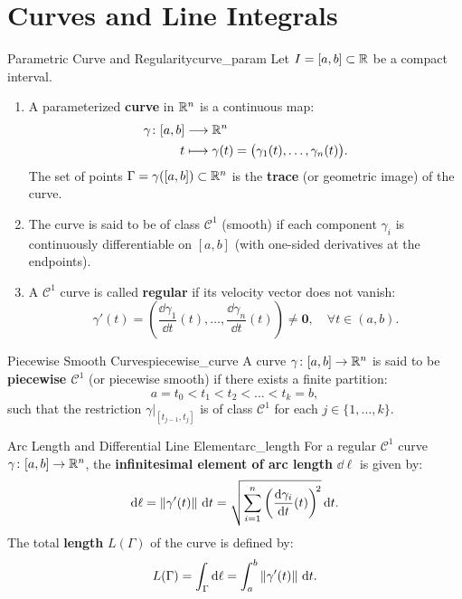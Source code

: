 \section{Curves and Line Integrals}

\begin{definition}{Parametric Curve and Regularity}{curve_param}
Let $I = [a, b] \subset \mathbb{R}$ be a compact interval.
\begin{enumerate}[label=\upshape(\roman*)]
    \item A parameterized \textbf{curve} in $\mathbb{R}^n$ is a continuous map:
    \begin{align*}
        \gamma \colon [a, b] &\longrightarrow \mathbb{R}^n \\
        t &\longmapsto \gamma(t) = \bigl(\gamma_1(t), \dots, \gamma_n(t)\bigr).
    \end{align*}
    The set of points $\Gamma = \gamma([a, b]) \subset \mathbb{R}^n$ is the \textbf{trace} (or geometric image) of the curve.
    \item The curve is said to be of class $\mathcal{C}^1$ (smooth) if each component $\gamma_i$ is continuously differentiable on $[a, b]$ (with one-sided derivatives at the endpoints).
    \item A $\mathcal{C}^1$ curve is called \textbf{regular} if its velocity vector does not vanish:
    \begin{equation}
        \gamma'(t) = \left( \frac{\dd \gamma_1}{\dd t}(t), \dots, \frac{\dd \gamma_n}{\dd t}(t) \right) \neq \mathbf{0}, \quad \forall t \in (a, b).
    \end{equation}
\end{enumerate}
\end{definition}

\begin{definition}{Piecewise Smooth Curves}{piecewise_curve}
A curve $\gamma \colon [a, b] \to \mathbb{R}^n$ is said to be \textbf{piecewise $\mathcal{C}^1$} (or piecewise smooth) if there exists a finite partition:
\begin{equation}
    a = t_0 < t_1 < t_2 < \dots < t_k = b,
\end{equation}
such that the restriction $\gamma|_{[t_{j-1}, t_j]}$ is of class $\mathcal{C}^1$ for each $j \in \{1, \dots, k\}$.
\end{definition}

\begin{definition}{Arc Length and Differential Line Element}{arc_length}
For a regular $\mathcal{C}^1$ curve $\gamma \colon [a, b] \to \mathbb{R}^n$, the \textbf{infinitesimal element of arc length} $\dd\ell$ is given by:
\begin{equation}
    \mathrm{d}\ell = \left\lVert\gamma'(t)\right\rVert \,\mathrm{d}t = \sqrt{\sum_{i=1}^n \left( \frac{\mathrm{d} \gamma_i}{\mathrm{d} t}(t) \right)^{\!2}} \,\mathrm{d}t.
\end{equation}
The total \textbf{length} $L(\Gamma)$ of the curve is defined by:
\begin{equation}
    L(\Gamma) = \int_{\Gamma} \mathrm{d}\ell = \int_a^b \left\lVert\gamma'(t)\right\rVert \,\mathrm{d}t.
\end{equation}
\end{definition}

